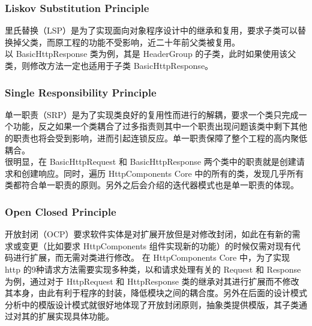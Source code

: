 \documentclass{article}
\begin{document}
	\subsubsection{Liskov Substitution Principle}
	\begin{CJK}{UTF8}{gbsn}
		\indent \indent 里氏替换（LSP）是为了实现面向对象程序设计中的继承和复用，要求子类可以替换掉父类，而原工程的功能不受影响，近二十年前父类被复用。\\
		\indent 以 BasicHttpResponse 类为例，其是 HeaderGroup 的子类，此时如果使用该父类，则修改方法一定也适用于子类 BasicHttpResponse。
	\end{CJK}{}

	\subsubsection{Single Responsibility Principle}
	\begin{CJK}{UTF8}{gbsn}
		\indent \indent 单一职责（SRP）是为了实现类良好的复用性而进行的解耦，要求一个类只完成一个功能，反之如果一个类耦合了过多指责则其中一个职责出现问题该类中剩下其他的职责也将会受到影响，进而引起连锁反应。单一职责保障了整个工程的高内聚低耦合。\\
		\indent 很明显，在 BasicHttpRequest 和 BasicHttpResponse 两个类中的职责就是创建请求和创建响应。同时，遍历 HttpComponents Core 中的所有的类，发现几乎所有类都符合单一职责的原则。另外之后会介绍的迭代器模式也是单一职责的体现。
	\end{CJK}{}

	\subsubsection{Open Closed Principle}
	\begin{CJK}{UTF8}{gbsn}
		\indent \indent 开放封闭（OCP）要求软件实体是对扩展开放但是对修改封闭，如此在有新的需求或变更（比如要求 HttpComponents 组件实现新的功能）的时候仅需对现有代码进行扩展，而无需对类进行修改。
		\indent 在 HttpComponents Core 中，为了实现 http 的9种请求方法需要实现多种类，以和请求处理有关的 Request 和 Response 为例，通过对于 HttpRequest 和 HttpResponse 类的继承对其进行扩展而不修改其本身，由此有利于程序的封装，降低模块之间的耦合度。另外在后面的设计模式分析中的模版设计模式就很好地体现了开放封闭原则，抽象类提供模版，其子类通过对其的扩展实现具体功能。
	\end{CJK}{}
\end{document}
